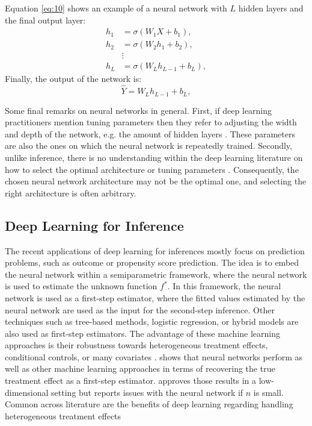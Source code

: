 Equation \ref{eq:10} shows an example of a neural network with $L$ hidden layers and the final output layer:
\begin{align}
h_1 &= \sigma(W_1 X + b_1), \nonumber \\
h_2 &= \sigma(W_2 h_1 + b_2), \nonumber  \\
&\vdots \nonumber \\
h_L &= \sigma(W_L h_{L-1} + b_L),
\label{eq:10}
\end{align}
Finally, the output of the network is:
\begin{equation}
\hat{Y} = W_L h_{L-1} + b_L, \nonumber
\end{equation}



Some final remarks on neural networks in general.
First, if deep learning practitioners mention tuning parameters then they refer to adjusting the width and depth of the network, e.g. the amount of hidden layers \citep{farrellDeepNeuralNetworks2021}.
These parameters are also the ones on which the neural network is repeatedly trained.
Secondly, unlike inference, there is no understanding within the deep learning literature on how to select the optimal architecture or tuning parameters \citep[see][]{10.1214/19-AOS1875,telgarsky2016benefits}.
Consequently, the chosen neural network architecture may not be the optimal one, and selecting the right architecture is often arbitrary.
\subsection{Deep Learning for Inference}
The recent applications of deep learning for inferences mostly focus on prediction problems, such as outcome or propensity score prediction.
The idea is to embed the neural network within a semiparametric framework, where the neural network is used to estimate the unknown function $f^*$.
In this framework, the neural network is used as a first-step estimator, where the fitted values estimated by the neural network are used as the input for the second-step inference. %
Other techniques such as tree-based methods, logistic regression, or hybrid models are also used as first-step estimators.
The advantage of these machine learning approaches is their robustness towards heterogeneous treatment effects, conditional controls, or many covariates \citep{belloni2017program}.
\citet{belloni2017program} shows that neural networks perform as well as other machine learning approaches in terms of recovering the true treatment effect as a first-step estimator.
\citet{chernozhukovDoubleDebiasedMachine2018} approves those results in a low-dimensional setting but reports issues with the neural network if $n$ is small.
Common across literature are the benefits of deep learning regarding handling heterogeneous treatment effects \citep[see][]{DeepLearningIndividual2021,belloni2017program,chernozhukovDoubleDebiasedMachine2018}

